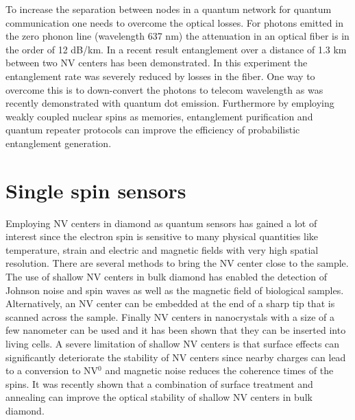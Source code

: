 To increase the separation between nodes in a quantum network for quantum communication one needs to overcome the optical losses. For photons emitted in the zero phonon line (wavelength 637 nm) the attenuation in an optical fiber is in the order of 12 dB/km. In a recent result entanglement over a distance of 1.3 km between two NV centers has been demonstrated\cite{Hensen_arXiv_2015}. In this experiment the entanglement rate was severely reduced by losses in the fiber. One way to overcome this is to down-convert the photons to telecom wavelength as was recently demonstrated with quantum dot emission\cite{DeGreve_Nature_2012,Zaske_Phys.Rev.Lett._2012}. Furthermore by employing weakly coupled nuclear spins as memories, entanglement purification\cite{Campbell_Phys.Rev.Lett._2008} and quantum repeater protocols\cite{Briegel_Phys.Rev.Lett._1998} can improve the efficiency of probabilistic entanglement generation.

\section{Single spin sensors}
Employing NV centers in diamond as quantum sensors \cite{Taylor_NatPhys_2008,Schirhagl__2014} has gained a lot of interest since the electron spin is sensitive to many physical quantities like temperature\cite{Acosta_Phys.Rev.Lett._2010,Toyli_PNAS_2013}, strain\cite{Ovartchaiyapong_NatCommun_2014} and electric and magnetic fields\cite{Taylor_NatPhys_2008,Dolde_NatPhys_2011} with very high spatial resolution. There are several methods to bring the NV center close to the sample. The use of shallow NV centers in bulk diamond has enabled the detection of Johnson noise\cite{Kolkowitz_Science_2015} and spin waves\cite{vanderSar_NatCommun_2015} as well as the magnetic field of biological samples\cite{LeSage_Nature_2013}. Alternatively, an NV center can be embedded at the end of a sharp tip that is scanned across the sample\cite{Balasubramanian_Nature_2008,Maletinsky_NatNano_2012,Rondin__2012,Pelliccione_Phys.Rev.Applied_2014,Haberle_NatNano_2015}. Finally NV centers in  nanocrystals with a size of a few nanometer can be used and it has been shown that they can be inserted into living cells\cite{Kucsko_Nature_2013}. A severe limitation of shallow NV centers is that surface effects can significantly deteriorate the stability of NV centers since nearby charges can lead to a conversion to NV$^0$ and magnetic noise reduces the coherence times of the spins. It was recently shown that a combination of surface treatment and annealing can improve the optical stability of shallow NV centers in bulk diamond\cite{Chu_NanoLett._2014}.

